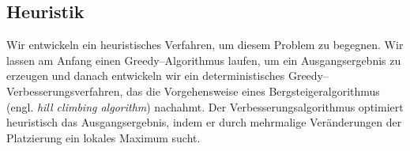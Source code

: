 \subsection{Heuristik}
Wir entwickeln ein heuristisches Verfahren, um diesem Problem zu begegnen. 
Wir lassen am Anfang einen Greedy--Algorithmus laufen, um ein Ausgangsergebnis zu erzeugen und
danach entwickeln wir ein deterministisches Greedy--Verbesserungsverfahren, das die Vorgehensweise
eines Bergsteigeralgorithmus (engl. \textit{hill climbing algorithm}) nachahmt. 
Der Verbesserungsalgorithmus optimiert heuristisch das Ausgangsergebnis, 
indem er durch mehrmalige Veränderungen der Platzierung ein lokales Maximum sucht.



